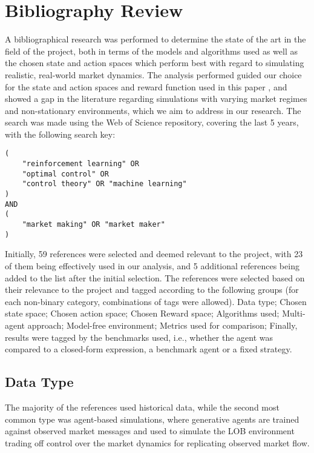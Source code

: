 \section{Bibliography Review}
\label{sec:bibliography-review}

A bibliographical research was performed to determine the state of the art in the field of the project,
both in terms of the models and algorithms used as well as the chosen state and action spaces which perform best
with regard to simulating realistic, real-world market dynamics.
The analysis performed guided our choice for the state and action spaces and reward function used in this paper ,
and showed a gap in the literature regarding simulations with varying market regimes and non-stationary environments, which we aim to address in our research.
The search was made using the Web of Science repository, covering the last 5 years, with the following search key:

\small
\begin{verbatim}
(
    "reinforcement learning" OR
    "optimal control" OR
    "control theory" OR "machine learning"
)
AND
(
    "market making" OR "market maker"
)
\end{verbatim}

Initially, 59 references were selected and deemed relevant to the project,
with 23 of them being effectively used in our analysis, and 5 additional references being added to the list after the initial selection.
The references were selected based on their relevance to the project and tagged according to the following groups
(for each non-binary category, combinations of tags were allowed).
Data type; Chosen state space; Chosen action space; Chosen Reward space; Algorithms used; Multi-agent approach; Model-free environment; Metrics used for comparison;
Finally, results were tagged by the benchmarks used, i.e., whether the agent was compared to a closed-form expression, a benchmark agent or a fixed strategy.

\subsection{Data Type}
\label{subsec:data-type}
The majority of the references used historical data, while the second most common type was agent-based simulations,
where generative agents are trained against observed market messages and used to simulate the LOB environment~\cite{Frey2023, Ganesh2019}
trading off control over the market dynamics for replicating observed market flow.

